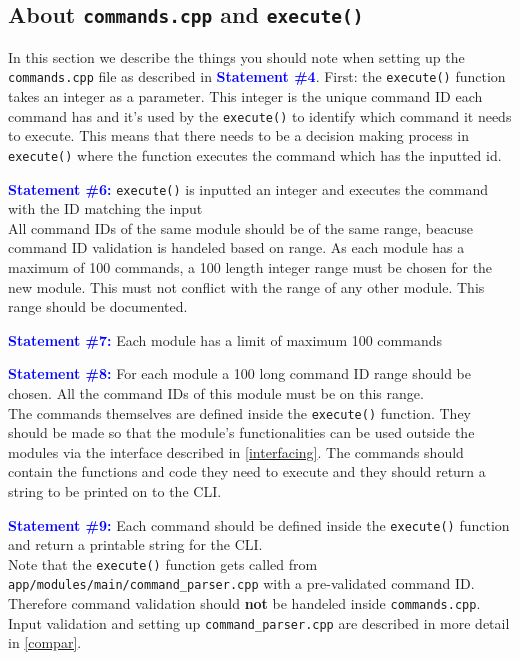 \documentclass{article}
\newcommand{\statement}[1]{\par\medskip
  \textcolor{blue}{\textbf{#1:}}\space
}
\begin{document}
\subsection{About \texttt{commands.cpp} and \texttt{execute()}}\label{commccp}
In this section we describe the things you should note when setting up the 
\texttt{commands.cpp} file as described in 
\textcolor{blue}{\textbf{Statement \#4}}. First: the \texttt{execute()} 
function takes an integer as a parameter. This integer is the unique command 
ID each command has and it's used by the \texttt{execute()} to identify which 
command it needs to execute. This means that there needs to be a decision 
making process in \texttt{execute()} where the function executes the command 
which has the inputted id.

\statement{Statement \#6} \texttt{execute()} is inputted an integer and 
executes the command with the ID matching the input \\

All command IDs of the same module should be of the same range, beacuse 
command ID validation is handeled based on range. As each module has a maximum 
of 100 commands, a 100 length integer range must be chosen for the new module. 
This must not conflict with the range of any other module. This range should 
be documented.

\statement{Statement \#7} Each module has a limit of maximum 100 commands

\statement{Statement \#8} For each module a 100 long command ID range should 
be chosen. All the command IDs of this module must be on this range. \\

The commands themselves are defined inside the \texttt{execute()} function. 
They should be made so that the module's functionalities can be used outside 
the modules via the interface described in \ref{interfacing}.  The commands 
should contain the functions and code they need to execute and they should 
return a string to be printed on to the CLI.

\statement{Statement \#9} Each command should be defined inside the 
\texttt{execute()} function and return a printable string for the CLI. \\

Note that the \texttt{execute()} function gets called from 
\texttt{app/modules/main/command\_parser.cpp} with a pre-validated command ID.
Therefore command validation should \textbf{not} be handeled inside 
\texttt{commands.cpp}. Input validation and setting up 
\texttt{command\_parser.cpp} are described in more detail in \ref{compar}.
\end{document}
